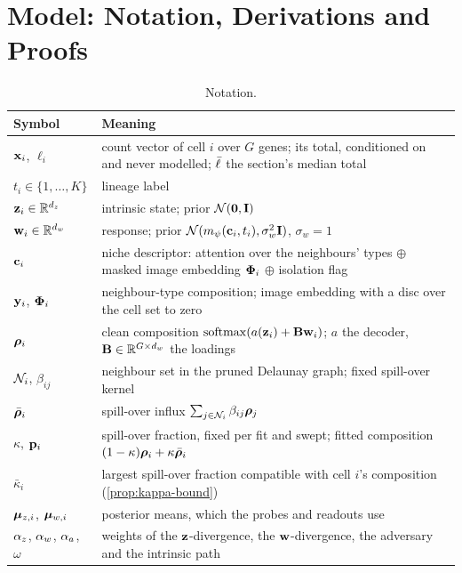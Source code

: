 \section{Model: Notation, Derivations and Proofs}
\label{app:derivations}

\begin{table}[!htbp]
\centering
\caption{Notation.}
\label{tab:S-notation}
\small
\begin{tabular}{@{}lp{}@{}}
\toprule
Symbol & Meaning \\
\midrule
$\mathbf{x}_i$, $\ell_i$ & count vector of cell $i$ over $G$ genes; its total, conditioned on and never modelled; $\bar{\ell}$ the section's median total \\
$t_i \in \{1,\dots,K\}$ & lineage label \\
$\mathbf{z}_i \in \mathbb{R}^{d_z}$ & intrinsic state; prior $\mathcal{N}(\mathbf{0},\mathbf{I})$ \\
$\mathbf{w}_i \in \mathbb{R}^{d_w}$ & response; prior $\mathcal{N}(m_{\psi}(\mathbf{c}_i,t_i), \sigma_w^2\mathbf{I})$, $\sigma_w = 1$ \\
$\mathbf{c}_i$ & niche descriptor: attention over the neighbours' types $\oplus$ masked image embedding $\boldsymbol{\Phi}_i$ $\oplus$ isolation flag \\
$\mathbf{y}_i$, $\boldsymbol{\Phi}_i$ & neighbour-type composition; image embedding with a disc over the cell set to zero \\
$\boldsymbol{\rho}_i$ & clean composition $\operatorname{softmax}(a(\mathbf{z}_i) + \mathbf{B}\mathbf{w}_i)$; $a$ the decoder, $\mathbf{B} \in \mathbb{R}^{G\times d_w}$ the loadings \\
$\mathcal{N}_{i}$, $\beta_{ij}$ & neighbour set in the pruned Delaunay graph; fixed spill-over kernel \\
$\bar{\boldsymbol{\rho}}_i$ & spill-over influx $\sum_{j\in\mathcal{N}_{i}}\beta_{ij}\boldsymbol{\rho}_j$ \\
$\kappa$, $\mathbf{p}_i$ & spill-over fraction, fixed per fit and swept; fitted composition $(1-\kappa)\boldsymbol{\rho}_i + \kappa\bar{\boldsymbol{\rho}}_i$ \\
$\bar\kappa_i$ & largest spill-over fraction compatible with cell $i$'s composition (\cref{prop:kappa-bound}) \\
$\boldsymbol{\mu}_{z,i}$, $\boldsymbol{\mu}_{w,i}$ & posterior means, which the probes and readouts use \\
$\alpha_z$, $\alpha_w$, $\alpha_a$, $\omega$ & weights of the $\mathbf{z}$-divergence, the $\mathbf{w}$-divergence, the adversary and the intrinsic path \\
\bottomrule
\end{tabular}
\end{table}

